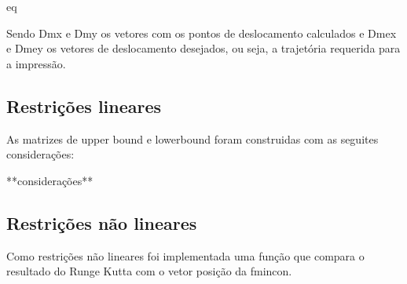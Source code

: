eq

Sendo Dmx e Dmy os vetores com os pontos de deslocamento 
calculados e Dmex e Dmey os vetores de deslocamento desejados, 
ou seja, a trajetória requerida para a impressão.

\subsection{Restrições lineares}
As matrizes de upper bound e lowerbound foram construidas com as seguites considerações:





**considerações**

\subsection{Restrições não lineares}
Como restrições não lineares foi implementada uma função que compara
o resultado do Runge Kutta com o vetor posição da fmincon.







    
    

    

